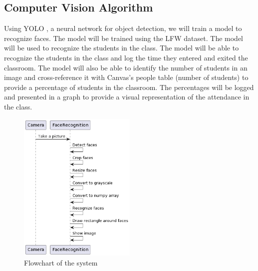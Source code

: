 \subsection{Computer Vision Algorithm}
\label{subsec:Computer Vision Algorithm}
Using YOLO \cite{YOLO}, a neural network for object detection, we will train a model to recognize faces. The model will be trained using the LFW dataset. The model will be used to recognize the students in the class. The model will be able to recognize the students in the class and log the time they entered and exited the classroom. The model will also be able to identify the number of students in an image and cross-reference it with Canvas's people table (number of students) to provide a percentage of students in the classroom. The percentages will be logged and presented in a graph to provide a visual representation of the attendance in the class.\\
\begin{figure}[h]
    \centering
    \includegraphics[width=0.5\textwidth]{images/Diagram-1.png}
    \caption{Flowchart of the system}
    \label{fig:flowchart}
\end{figure}






